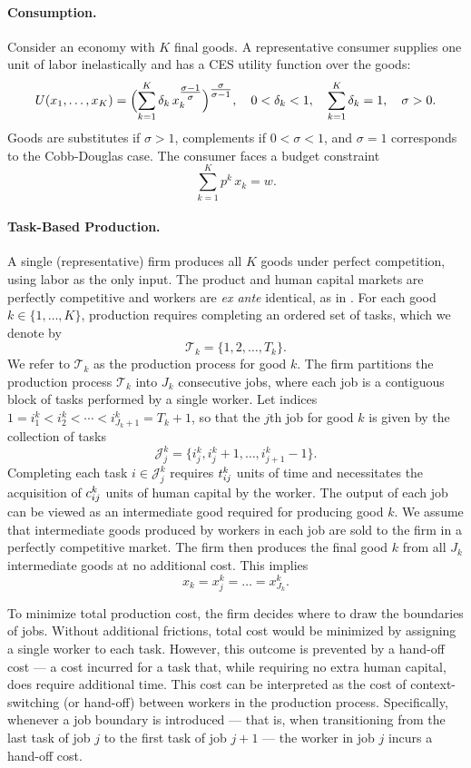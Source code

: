 \documentclass{article}
\theoremstyle{plain}
\theoremstyle{plain}
\begin{document}
\paragraph{Consumption.}

Consider an economy with $K$ final goods.  
A representative consumer supplies one unit of labor inelastically and has a CES utility function over the goods:
\[
U(x_{1}, \ldots, x_{K}) 
= 
\Bigl(\sum_{k=1}^{K} \delta_k \,x_k^{\tfrac{\sigma - 1}{\sigma}}\Bigr)^{\tfrac{\sigma}{\sigma-1}},
\quad
0 < \delta_k < 1, 
\quad
\sum_{k=1}^{K} \delta_k = 1,
\quad
\sigma > 0.
\]
Goods are substitutes if $\sigma > 1$, complements if $0 < \sigma < 1$, and $\sigma = 1$ corresponds to the Cobb-Douglas case.  
The consumer faces a budget constraint 
\[
\sum_{k=1}^K p^k \,x_k = w.
\]

\paragraph{Task-Based Production.}

A single (representative) firm produces all $K$ goods under perfect competition, using labor as the only input.  
The product and human capital markets are perfectly competitive and workers are \emph{ex ante} identical, as in \cite{becker1992division}.  
For each good $k \in \{1,\ldots,K\}$, production requires completing an ordered set of tasks, which we denote by
\[
\mathcal{T}_k = \{1,2,\ldots,T_k\}.
\]
We refer to $\mathcal{T}_k$ as the production process for good $k$.  
The firm partitions the production process $\mathcal{T}_k$ into $J_k$ consecutive jobs, where each job is a contiguous block of tasks performed by a single worker.  
Let indices $1 = i_1^k < i_2^k < \cdots < i_{J_k+1}^k = T_k+1$, so that the $j$th job for good $k$ is given by the collection of tasks
\[
\mathcal{J}_j^k = \{i_j^k, i_j^k+1, \ldots, i_{j+1}^k - 1\}.
\]
Completing each task $i \in \mathcal{J}_j^k$ requires $t_{ij}^{k}$ units of time and necessitates the acquisition of $c_{ij}^{k}$ units of human capital by the worker.  
The output of each job can be viewed as an intermediate good required for producing good $k$.  
We assume that intermediate goods produced by workers in each job are sold to the firm in a perfectly competitive market.  
The firm then produces the final good $k$ from all $J_k$ intermediate goods at no additional cost.  
This implies 
\[
x_k = x_j^k = \hdots = x_{J_k}^k.
\]

To minimize total production cost, the firm decides where to draw the boundaries of jobs.  
Without additional frictions, total cost would be minimized by assigning a single worker to each task.  
However, this outcome is prevented by a hand-off cost --- a cost incurred for a task that, while requiring no extra human capital, does require additional time.  
This cost can be interpreted as the cost of context-switching (or hand-off) between workers in the production process.  
Specifically, whenever a job boundary is introduced --- that is, when transitioning from the last task of job $j$ to the first task of job $j+1$ --- the worker in job $j$ incurs a hand-off cost.
\end{document}
